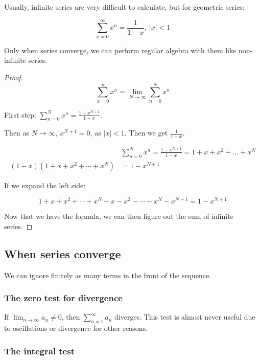\documentclass[12pt]{article}
\theoremstyle{plain}
\theoremstyle{remark}
\theoremstyle{definition}
\begin{document}
Usually, infinite series are very difficult to calculate, but for
geometric series:

\[\sum_{x = 0}^{\infty}x^{n} = \frac{1}{1 - x},\ |x| < 1\]

Only when series converge, we can perform regular algebra with them like
non-infinite series.

\begin{proof}

\[\sum_{x = 0}^{\infty}x^{n} = \lim_{N \rightarrow \infty}{\sum_{n = 0}^{N}x^{n}}\]

First step: \(\sum_{n = 0}^{N}x^{n} = \frac{1 - x^{N + 1}}{1 - x}\).

Then as \(N \rightarrow \infty\), \(x^{N + 1} = 0\), as \(|x| < 1\).
Then we get \(\frac{1}{1 - x}\).

\begin{align*}
&\sum_{n = 0}^{N}x^{n} = \frac{1 - x^{N + 1}}{1 - x} = 1 + x + x^{2} + \ldots + x^{N} \\
(1 - x)\left( 1 + x + x^{2} + \cdots + x^{N} \right) &= 1 - x^{N + 1}
\end{align*}


If we expand the left side:

\[1 + x + x^{2} + \cdots + x^{N} - x - x^{2} - \cdots - x^{N} - x^{N + 1} = 1 - x^{N + 1}\]

Now that we have the formula, we can then figure out the sum of infinite
series.


\end{proof}


\subsection{When series converge}

We can ignore finitely as many terms in the front of the sequence.


\subsubsection{The zero test for
divergence}

If \(\lim_{n \rightarrow \infty}a_{n} \neq 0\), then
\(\sum_{n = 1}^{\infty}a_{n}\) diverges. This test is almost never
useful due to oscillations or divergence for other reasons.


\subsubsection{The integral test}
\end{document}
